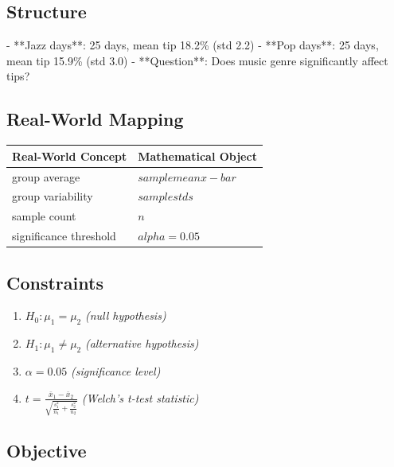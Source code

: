 \documentclass[11pt, a4paper]{article}
\begin{document}
\subsection{Structure}

- **Jazz days**: 25 days, mean tip 18.2\% (std 2.2)
- **Pop days**: 25 days, mean tip 15.9\% (std 3.0)
- **Question**: Does music genre significantly affect tips?

\subsection{Real-World Mapping}

\begin{longtable}{ll}
\toprule
\textbf{Real-World Concept} & \textbf{Mathematical Object} \\
\midrule
\endhead
group average & $sample mean x-bar$ \\
group variability & $sample std s$ \\
sample count & $n$ \\
significance threshold & $alpha = 0.05$ \\
\bottomrule
\end{longtable}

\subsection{Constraints}

\begin{enumerate}
  \item $H_0: \mu_1 = \mu_2$
  \hfill \textit{(null hypothesis)}
  \item $H_1: \mu_1 \neq \mu_2$
  \hfill \textit{(alternative hypothesis)}
  \item $\alpha = 0.05$
  \hfill \textit{(significance level)}
  \item $t = \frac{\bar{x}_1 - \bar{x}_2}{\sqrt{\frac{s_1^2}{n_1} + \frac{s_2^2}{n_2}}}$
  \hfill \textit{(Welch's t-test statistic)}
\end{enumerate}

\subsection{Objective}
\end{document}
